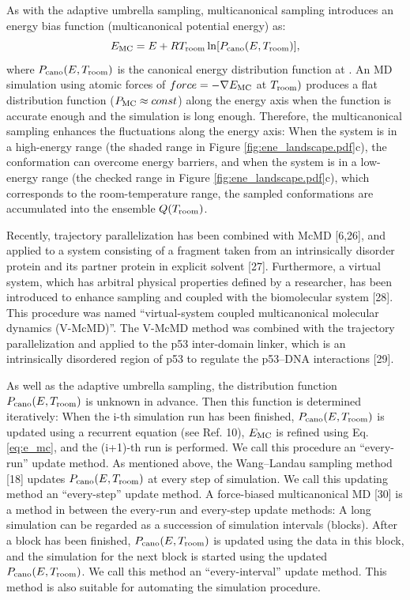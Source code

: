 As with the adaptive umbrella sampling, multicanonical sampling introduces an energy bias function (multicanonical potential energy) as:
\begin{equation}
\label{eq:e_mc}
E_{\rm MC} = E + RT_{\rm room} \ln [P_{\rm cano}(E,T_{\rm room})],
\end{equation}
where $P_{\rm cano}(E,T_{\rm room})$ is the canonical energy distribution function at . An MD simulation using atomic forces of $force=-\nabla E_{\rm MC}$ at $T_{\rm room})$ produces a flat distribution function ($P_{\rm MC} \approx const$) along the energy axis when the function  is accurate enough and the simulation is long enough. Therefore, the multicanonical sampling enhances the fluctuations along the energy axis: When the system is in a high-energy range (the shaded range in Figure \ref{fig:ene_landscape.pdf}c), the conformation can overcome energy barriers, and when the system is in a low-energy range (the checked range in Figure \ref{fig:ene_landscape.pdf}c), which corresponds to the room-temperature range, the sampled conformations are accumulated into the ensemble $Q(T_{\rm room})$.

Recently, trajectory parallelization has been combined with McMD [6,26], and applied to a system consisting of a fragment taken from an intrinsically disorder protein and its partner protein in explicit solvent [27]. Furthermore, a virtual system, which has arbitral physical properties defined by a researcher, has been introduced to enhance sampling and coupled with the biomolecular system [28]. This procedure was named “virtual-system coupled multicanonical molecular dynamics (V-McMD)”. The V-McMD method was combined with the trajectory parallelization and applied to the p53 inter-domain linker, which is an intrinsically disordered region of p53 to regulate the p53–DNA interactions [29].

As well as the adaptive umbrella sampling, the distribution function $P_{\rm cano}(E,T_{\rm room})$ is unknown in advance. Then this function is determined iteratively: When the i-th simulation run has been finished, $P_{\rm cano}(E,T_{\rm room})$ is updated using a recurrent equation (see Ref. 10), $E_{\rm MC}$ is refined using Eq. \ref{eq:e_mc}, and the (i+1)-th run is performed. We call this procedure an “every-run” update method. As mentioned above, the Wang–Landau sampling method [18] updates $P_{\rm cano}(E,T_{\rm room})$ at every step of simulation. We call this updating method an “every-step” update method. A force-biased multicanonical MD [30] is a method in between the every-run and every-step update methods: A long simulation can be regarded as a succession of simulation intervals (blocks). After a block has been finished, $P_{\rm cano}(E,T_{\rm room})$ is updated using the data in this block, and the simulation for the next block is started using the updated $P_{\rm cano}(E,T_{\rm room})$. We call this method an “every-interval” update method. This method is also suitable for automating the simulation procedure.


